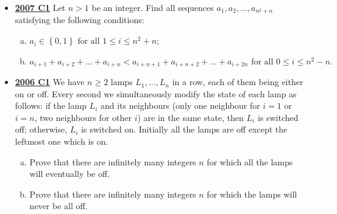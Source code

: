 \documentclass[11pt]{scrartcl}
\begin{document}
\begin{itemize}[leftmargin=*]
    Find the largest $ n$ for which there exist $ n$ boxes $ B_1$, $ \dots$, $ B_n$ such that $ B_i$ and $ B_j$ intersect if and only if $ i\not\equiv j\pm 1\pmod n$.
    \item \href{https://artofproblemsolving.com/community/c6h214707p1187174}{\textbf{2007 C1}} 	Let $ n > 1$ be an integer. Find all sequences $ a_1, a_2, \dots , a_{n^2 + n}$ satisfying the following conditions:
    \begin{enumerate}[(a)]
        \item $a_i \in \left\{0,1\right\} \text{ for all } 1 \leqslant i \leqslant n^2 + n;$
        \item $a_{i + 1} + a_{i + 2} + \dots + a_{i + n} < a_{i + n + 1} + a_{i + n + 2} + \dots + a_{i + 2n} \text{ for all } 0 \leqslant i \leqslant n^2 - n.$
    \end{enumerate}
    \item \href{https://artofproblemsolving.com/community/c6h155692p874978}{\textbf{2006 C1}} We have $ n \geqslant  2$ lamps $ L_{1}, \dots ,L_{n}$ in a row, each of them being either on or off. Every second we simultaneously modify the state of each lamp as follows: if the lamp $ L_{i}$ and its neighbours (only one neighbour for $ i = 1$ or $ i = n$, two neighbours for other $ i$) are in the same state, then $ L_{i}$ is switched off; otherwise, $ L_{i}$ is switched on. Initially all the lamps are off except the leftmost one which is on. 
    \begin{enumerate}[(a)]
        \item Prove that there are infinitely many integers $n$ for which all the lamps will eventually be off.
        \item Prove that there are infinitely many integers $n$ for which the lamps will never be all off.
    \end{enumerate}
\end{itemize}
\newpage
\end{document}
